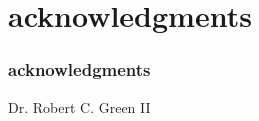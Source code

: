 
\section*{acknowledgments}

\begin{frame}
  \frametitle{acknowledgments}
  Dr. Robert C. Green II
\end{frame}